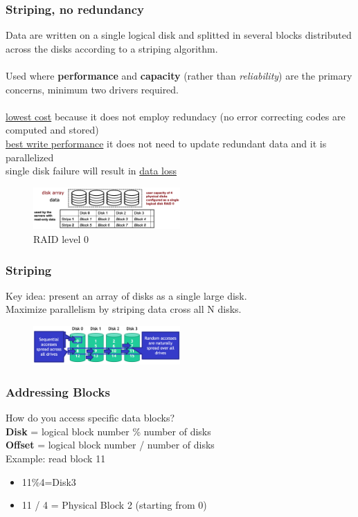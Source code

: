 \documentclass[10pt, oneside]{article}
\begin{document}
\subsubsection*{Striping, no redundancy}
\begin{multicols}{2}
    Data are written on a single logical disk and splitted in several blocks distributed across the disks according to a striping algorithm.\\\\Used where {\bf performance} and {\bf capacity} (rather than {\sl reliability}) are the primary concerns, minimum two drivers required.\\\\
\underline{lowest cost} because it does not employ redundacy (no error correcting codes are computed and stored)\\
\underline{best write performance} it does not need to update redundant data and it is parallelized\\
single disk failure will result in \underline{data loss}\columnbreak
\begin{figure}[H]
    \begin{center}
    \includegraphics[width=0.5\textwidth]{img/img62.png}
    \caption{RAID level 0}
    \end{center}
\end{figure}
\end{multicols}
\subsubsection*{Striping}
Key idea: present an array of disks as a single large disk.\\
Maximize parallelism by striping data cross all N disks.\begin{figure}[H]
    \begin{center}
    \includegraphics[width=0.5\textwidth]{img/img63.png}
    \end{center}
\end{figure}
\subsubsection*{Addressing Blocks}
How do you access specific data blocks?\\
{\bf Disk} = logical block number \% number of disks\\
{\bf Offset} = logical block number / number of disks\\
Example: read block 11\begin{itemize}
    \item 11\%4=Disk3
    \item 11 / 4 = Physical Block 2 (starting from 0)
\end{itemize}
\end{document}
